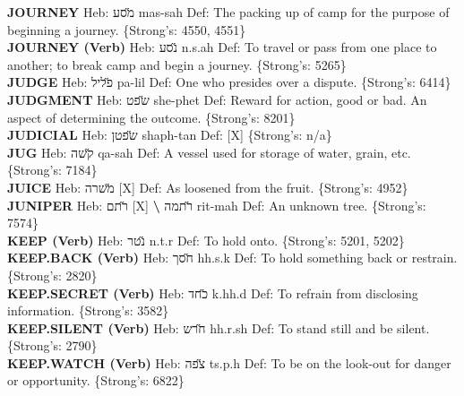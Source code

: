 {\textbf{JOURNEY} Heb: {\large\H מסע} mas-sah Def: The packing up of camp for the purpose of beginning a journey. \{Strong's: 4550, 4551\}\hfill{}\\

\textbf{JOURNEY (Verb)} Heb: {\large\H נסע} n.s.ah Def: To travel or pass from one place to another; to break camp and begin a journey. \{Strong's: 5265\}\hfill{}\\

\textbf{JUDGE} Heb: {\large\H פליל} pa-lil Def: One who presides over a dispute. \{Strong's: 6414\}\hfill{}\\

\textbf{JUDGMENT} Heb: {\large\H שפט} she-phet Def: Reward for action, good or bad. An aspect of determining the outcome. \{Strong's: 8201\}\hfill{}\\

\textbf{JUDICIAL} Heb: {\large\H שפטן} shaph-tan Def: {[}X{]} \{Strong's: n/a\}\hfill{}\\

\textbf{JUG} Heb: {\large\H קשה} qa-sah Def: A vessel used for storage of water, grain, etc. \{Strong's: 7184\}\hfill{}\\

\textbf{JUICE} Heb: {\large\H משרה} {[}X{]} Def: As loosened from the fruit. \{Strong's: 4952\}\hfill{}\\

\textbf{JUNIPER} Heb: {\large\H רתם} {[}X{]} \textbf{\textbackslash{}} {\large\H רתמה} rit-mah Def: An unknown tree. \{Strong's: 7574\}\hfill{}\\

\textbf{KEEP (Verb)} Heb: {\large\H נטר} n.t.r Def: To hold onto. \{Strong's: 5201, 5202\}\hfill{}\\

\textbf{KEEP.BACK (Verb)} Heb: {\large\H חסך} hh.s.k Def: To hold something back or restrain. \{Strong's: 2820\}\hfill{}\\

\textbf{KEEP.SECRET (Verb)} Heb: {\large\H כחד} k.hh.d Def: To refrain from disclosing information. \{Strong's: 3582\}\hfill{}\\

\textbf{KEEP.SILENT (Verb)} Heb: {\large\H חרש} hh.r.sh Def: To stand still and be silent. \{Strong's: 2790\}\hfill{}\\

\textbf{KEEP.WATCH (Verb)} Heb: {\large\H צפה} ts.p.h Def: To be on the look-out for danger or opportunity. \{Strong's: 6822\}\hfill{}\\

}
